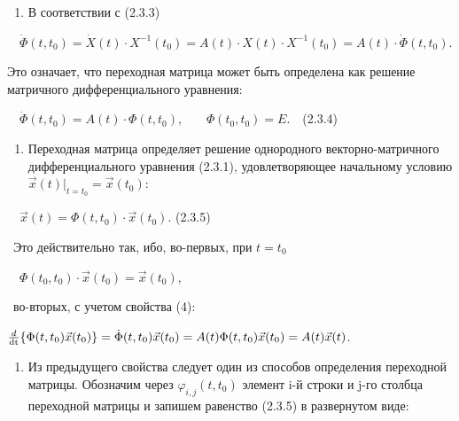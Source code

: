 \liststyleWWviiiNumxxvii
\setcounter{saveenum}{\value{enumi}}
\begin{enumerate}
	\setcounter{enumi}{\value{saveenum}}
	\item 
			В соответствии с (2.3.3)
	
\end{enumerate}

		\ \  $\dot \Phi (t,t_0)=\dot X(t)\cdot X^{-1}(t_0)=A(t)\cdot X(t)\cdot X^{-1}(t_0)=A(t)\cdot \dot \Phi (t,t_0)$.



		Это означает, что переходная матрица может быть определена как решение матричного дифференциального уравнения:



		\ \  $\dot \Phi (t,t_0)=A(t)\cdot \Phi (t,t_0),$ \ \ \  $\Phi (t_0,t_0)=E.$\ \ (2.3.4)


\liststyleWWviiiNumxxvii
\setcounter{saveenum}{\value{enumi}}
\begin{enumerate}
	\setcounter{enumi}{\value{saveenum}}
	\item 
			Переходная матрица определяет решение однородного векторно-матричного дифференциального уравнения (2.3.1),
			удовлетворяющее начальному условию  $\vec x(t)|_{t=t_0}=\vec x(t_0)$:
	
\end{enumerate}

		\ \  $\vec x(t)=\Phi (t,t_0)\cdot \vec x(t_0)$.  (2.3.5)



		\ Это действительно так, ибо, во-первых, при  $t=t_0$



		\ \  $\Phi (t_0,t_0)\cdot \vec x(t_0)=\vec x(t_0)$,



		\ во-вторых, с учетом свойства (4): 



		$\frac d{\normalsubformula{\text{dt}}}\{\Phi (t,t_0)\vec x(t_0)\}=\dot \Phi (t,t_0)\vec x(t_0)=A(t)\Phi (t,t_0)\vec x(t_0)=A(t)\vec
		x(t)$.


\liststyleWWviiiNumxxvii
\setcounter{saveenum}{\value{enumi}}
\begin{enumerate}
	\setcounter{enumi}{\value{saveenum}}
	\item 
			Из предыдущего свойства следует один из способов определения переходной матрицы. Обозначим через  $\varphi _{i,j}(t,t_0)$
			элемент {i}-й строки и {j}-го столбца переходной матрицы и запишем равенство (2.3.5) в
			развернутом виде:
	
\end{enumerate}

